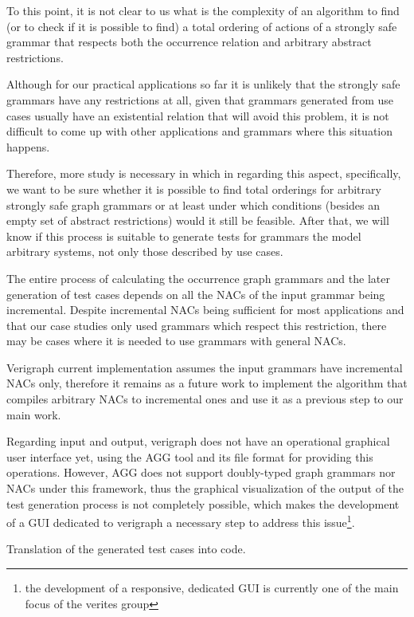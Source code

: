   To this point, it is not clear to us what is the complexity of an algorithm to find (or to check if it is possible to find) a total ordering of actions of a strongly safe grammar that respects both the occurrence relation and arbitrary abstract restrictions.

  Although for our practical applications so far it is unlikely that the strongly safe grammars have any restrictions at all, given that grammars generated from use cases usually have an existential relation that will avoid this problem, it is not difficult to come up with other applications and grammars where this situation happens.

  Therefore, more study is necessary in which in regarding this aspect, specifically, we want to be sure whether it is possible to find total orderings for arbitrary strongly safe graph grammars or at least under which conditions (besides an empty set of abstract restrictions) would it still be feasible. After that, we will know if this process is suitable to generate tests for grammars the model arbitrary systems, not only those described by use cases.

 The entire process of calculating the occurrence graph grammars and the later generation of test cases depends on all the NACs of the input grammar being incremental. Despite incremental NACs being sufficient for most applications and that our case studies only used grammars which respect this restriction, there may be cases where it is needed to use grammars with general NACs.

  Verigraph current implementation assumes the input grammars have incremental NACs only, therefore it remains as a future work to implement the algorithm that compiles arbitrary NACs to incremental ones and use it as a previous step to our main work.

  Regarding input and output, verigraph does not have an operational graphical user interface yet, using the AGG tool and its  file format for providing this operations. However, AGG does not support doubly-typed graph grammars nor NACs under this framework, thus the graphical visualization of the output of the test generation process is not completely possible, which makes the development of a GUI dedicated to verigraph a necessary step to address this issue\footnote{the development
  of a responsive, dedicated GUI is currently one of the main focus of the verites group}.

  Translation of the generated test cases into code.
